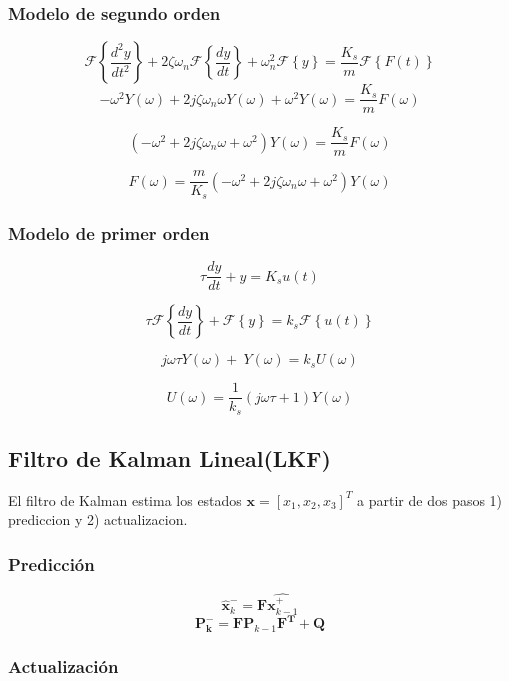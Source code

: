 \documentclass[conference]{IEEEtran}
\begin{document}
\subsubsection{Modelo de segundo orden}
\[
	\mathcal{F}\left\{ \frac{d^2y}{dt^2} \right\} + 2\zeta\omega_n \mathcal{F}\left\{\frac{dy}{dt}\right\} + \omega_n^2 \mathcal{F}\left\{y\right\} = \frac{K_s}{m} \mathcal{F}\left\{F(t)\right\}
\]
\[
	-\omega^2 Y(\omega)  + 2j\zeta\omega_n\omega Y(\omega) + \omega^2 Y(\omega) = \frac{K_s}{m}F(\omega)
\]
	
\[
	\left(-\omega^2  + 2j\zeta\omega_n\omega + \omega^2 \right) Y(\omega) = \frac{K_s}{m} F(\omega)
\]

\[
	F(\omega) = \frac{m}{K_s}  \left(-\omega^2  + 2j\zeta\omega_n\omega + \omega^2 \right) Y(\omega)
\]



\subsubsection{Modelo de primer orden}

\[
	\tau \frac{dy}{dt} + y = K_s u(t)
\]

\[
	\tau \mathcal{F}\left\{\frac{dy}{dt}\right\} + \mathcal{F} \left\{y\right\} = k_s \mathcal{F} \left\{u(t) \right\}
\]

\[
	 j\omega \tau  Y(\omega) + \ Y(\omega) = k_s U(\omega)
\]

\[
	U(\omega) = \frac{1}{k_s} (j\omega \tau + 1) Y(\omega)
\]

\subsection{Filtro de Kalman Lineal(LKF)}

El filtro de Kalman estima los estados $\textbf{x} = [x_1, x_2, x_3]^T$ a partir de dos pasos 1) prediccion y 2) actualizacion.



\subsubsection{Predicci\'on}


\[
\hat{\mathbf{x}}_k^- = \mathbf{F}\hat{\mathbf{x}^+_{k-1}}
\]
\[
\mathbf{P^-_k} = \mathbf{F} \mathbf{P}_{k-1} \mathbf{F^T} + \mathbf{Q}
\]

\subsubsection{Actualizaci\'on}
\end{document}
